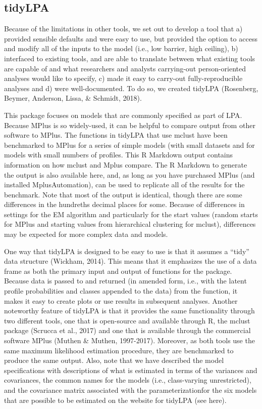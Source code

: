 \documentclass[man]{apa6}
\begin{document}
\hypertarget{tidylpa}{%
\subsection{tidyLPA}\label{tidylpa}}

Because of the limitations in other tools, we set out to develop a tool that a)
provided sensible defaults and were easy to use, but provided the option to
access and modify all of the inputs to the model (i.e., low barrier, high
ceiling), b) interfaced to existing tools, and are able to translate between
what existing tools are capable of and what researchers and analysts
carrying-out person-oriented analyses would like to specify, c) made it easy to
carry-out fully-reproducible analyses and d) were well-documented. To do so, we
created tidyLPA (Rosenberg, Beymer, Anderson, Lissa, \& Schmidt, 2018).

This package focuses on models that are commonly specified as part of LPA.
Because MPlus is so widely-used, it can be helpful to compare output from other
software to MPlus. The functions in tidyLPA that use mclust have been
benchmarked to MPlus for a series of simple models (with small datasets and for
models with small numbers of profiles. This R Markdown output contains
information on how mclust and Mplus compare. The R Markdown to generate the
output is also available here, and, as long as you have purchased MPlus (and
installed MplusAutomation), can be used to replicate all of the results for the
benchmark. Note that most of the output is identical, though there are some
differences in the hundreths decimal places for some. Because of differences in
settings for the EM algorithm and particularly for the start values (random
starts for MPlus and starting values from hierarchical clustering for mclust),
differences may be expected for more complex data and models.

One way that tidyLPA is designed to be easy to use is that it assumes a \enquote{tidy}
data structure (Wickham, 2014). This means that it emphasizes the use of a data
frame as both the primary input and output of functions for the package. Because
data is passed to and returned (in amended form, i.e., with the latent profile
probabilities and classes appended to the data) from the function, it makes it
easy to create plots or use results in subsequent analyses. Another noteworthy
feature of tidyLPA is that it provides the same functionality through two
different tools, one that is open-source and available through R, the mclust
package (Scrucca et al., 2017) and one that is available through the commercial
software MPlus (Muthen \& Muthen, 1997-2017). Moreover, as both tools use the
same maximum likelihood estimation procedure, they are benchmarked to produce
the same output. Also, note that we have described the model
specifications with descriptions of what is estimated in terms of the variances
and covariances, the common names for the models (i.e., class-varying
unrestricted), and the covariance matrix associated with the parameterizationfor
the six models that are possible to be estimated on the website for tidyLPA (see
here).
\end{document}
